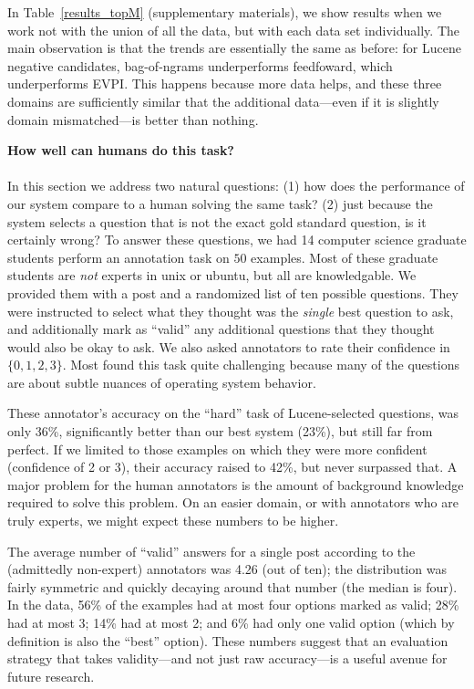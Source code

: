 \documentclass[11pt]{article}
\begin{document}
In Table~\ref{results_topM} (supplementary materials), we show results when we work not with the union of all the data, but with each data set individually.
The main observation is that the trends are essentially the same as before: for Lucene negative candidates, bag-of-ngrams underperforms feedfoward, which underperforms EVPI.
This happens because more data helps, and these three domains are sufficiently similar that the additional data---even if it is slightly domain mismatched---is better than nothing.

\textbf{How well can humans do this task?}\\\\

In this section we address two natural questions:
(1) how does the performance of our system compare to a human solving the same task?
(2) just because the system selects a question that is not the exact gold standard question, is it certainly wrong?
To answer these questions, we had 14 computer science graduate students perform an annotation task on $50$ examples.
Most of these graduate students are \emph{not} experts in unix or ubuntu, but all are knowledgable.
We provided them with a post and a randomized list of ten possible questions.
They were instructed to select what they thought was the \emph{single} best question to ask, and additionally mark as ``valid'' any additional questions that they thought would also be okay to ask.
We also asked annotators to rate their confidence in $\{0,1,2,3\}$.
Most found this task quite challenging because many of the questions are about subtle nuances of operating system behavior.

These annotator's accuracy on the ``hard'' task of Lucene-selected questions, was only 36\%, significantly better than our best system (23\%), but still far from perfect.
If we limited to those examples on which they were more confident (confidence of 2 or 3), their accuracy raised to 42\%, but never surpassed that.
A major problem for the human annotators is the amount of background knowledge required to solve this problem.
On an easier domain, or with annotators who are truly experts, we might expect these numbers to be higher.

The average number of ``valid'' answers for a single post according to the (admittedly non-expert) annotators was 4.26 (out of ten); the distribution was fairly symmetric and quickly decaying around that number (the median is four).
In the data, 56\% of the examples had at most four options marked as valid; 
28\% had at most 3; 14\% had at most 2; and 6\% had only one valid option (which by definition is also the ``best'' option).
These numbers suggest that an evaluation strategy that takes validity---and not just raw accuracy---is a useful avenue for future research.
\end{document}
